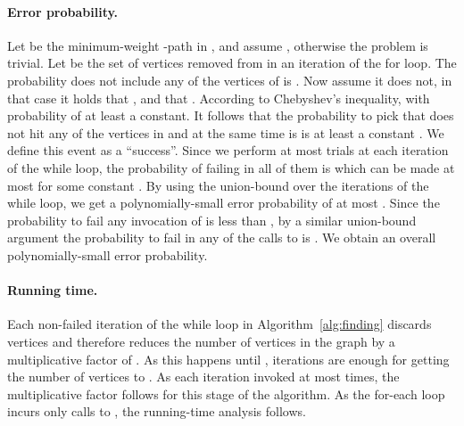 \documentclass{llncs}
\begin{document}
\paragraph{Error probability.} Let  be the minimum-weight -path in , and assume , otherwise the problem is trivial.
Let  be the set of vertices removed from  in an iteration of the for loop. 
The probability  does not include any of the vertices of  is . Now assume it does not, in that case it holds that , and that . According to Chebyshev's inequality,  with probability of at least a constant. It follows that the probability to pick  that does not hit any of the vertices in  and at the same time is  is at least a constant . 
We define this event as a ``success''. Since we perform at most  trials at each iteration of the while loop, the probability of failing in all of them is  which can be made at most   for some constant . By using the union-bound over the  iterations of the while loop, we get a polynomially-small error probability of at most . Since the probability to fail any invocation of  is less than , by a similar union-bound argument the probability to fail in any of the calls to  is  . We obtain an overall polynomially-small error probability.

\paragraph{Running time.} Each non-failed iteration of the while loop in Algorithm~\ref{alg:finding} discards  vertices and therefore reduces the number of vertices in the graph by a multiplicative factor of . As this happens until ,  iterations are enough for getting the number of vertices to .
As each iteration invoked  at most  times, the  multiplicative factor follows for this stage of the algorithm. As the for-each loop incurs only  calls to , the running-time analysis follows.
\end{document}
